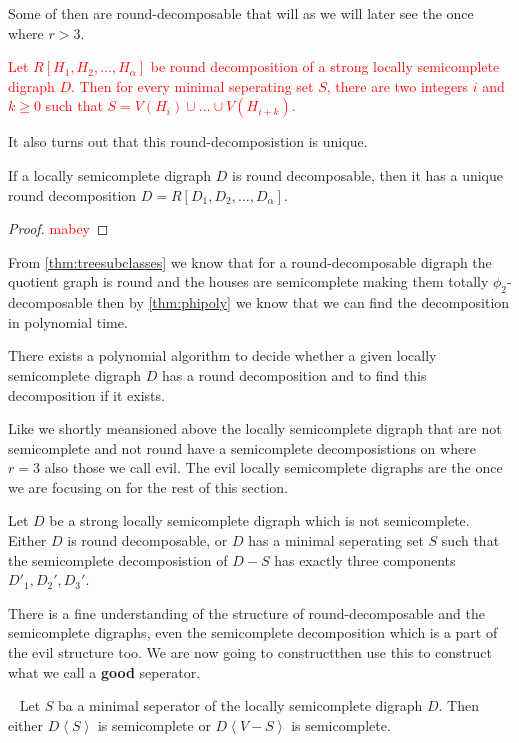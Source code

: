 Some of then are round-decomposable that will as we will later see the once where $r>3$. 
\textcolor{red}{\begin{prop}
    Let $R[H_1,H_2,\dots , H_{\alpha}]$ be round decomposition of a strong locally semicomplete digraph $D$. Then for every minimal seperating set $S$, there are two integers $i$ and $k\geq 0$ such that $S=V(H_i)\cup \dots \cup V(H_{i+k})$. 
\end{prop}}
It also turns out that this round-decomposistion is unique.
\begin{cor}
    If a locally semicomplete digraph $D$ is round decomposable, then it has a unique round decomposition $D=R[D_1,D_2,\dots ,D_{\alpha}]$.
\end{cor}
\begin{proof}
    \textcolor{red}{mabey}
\end{proof}
From \autoref{thm:treesubclasses} we know that for a round-decomposable digraph the quotient graph is round and the houses are semicomplete making them totally $\phi_2$-decomposable then by \autoref{thm:phipoly} we know that we can find the decomposition in polynomial time.
\begin{prop}
    There exists a polynomial algorithm to decide whether a given locally semicomplete digraph $D$ has a round decomposition and to find this decomposition if it exists.
\end{prop}
Like we shortly meansioned above the locally semicomplete digraph that are not semicomplete and not round have a semicomplete decomposistions on where $r=3$ also those we call evil.
The evil locally semicomplete digraphs are the once we are focusing on for the rest of this section.
\begin{lemma}
    Let $D$ be a strong locally semicomplete digraph which is not semicomplete. Either $D$ is round decomposable, or $D$ has a minimal seperating set $S$ such that the semicomplete decomposistion of $D-S$ has exactly three components $D'_1,D_2',D_3'$.
\end{lemma}
There is a fine understanding of the structure of round-decomposable and the semicomplete digraphs, even the semicomplete decomposition which is a part of the evil structure too.
We are now going to constructthen use this to construct what we call a \textbf{good} seperator.
\begin{lemma}~\cite{bangJGT85}
    Let $S$ ba a minimal seperator of the locally semicomplete digraph $D$. Then either $D\left< S\right>$ is semicomplete or $D\left< V-S\right>$ is semicomplete.
    \label{lem:whichsemicomplete}
\end{lemma}
